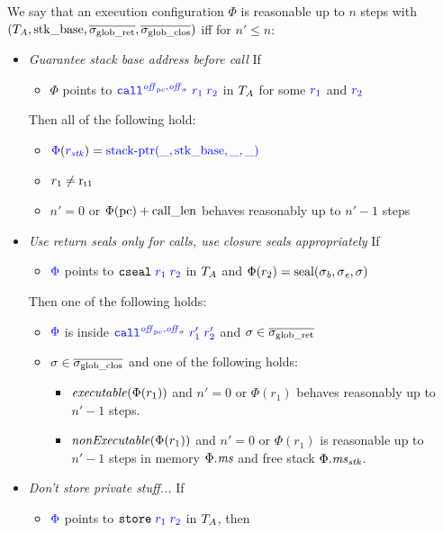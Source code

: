 \documentclass[a4paper]{article}
\begin{document}
\begin{definition}
  \label{def:reasonable-conf}
  We say that an execution configuration $\Phi$ is reasonable up to $n$ steps with $(T_{A},\mathrm{stk\_base},\overline{\sigma_{\mathrm{glob\_ret}}},\overline{\sigma_{\mathrm{glob\_clos}}})$ 
  iff for $n' \leq n$:
  \begin{itemize}
  \item \emph{Guarantee stack base address before call} If
    \begin{itemize}
    \item $\Phi$ points to $\src{\scall{\offpc,\offsigma}{r_1}{r_2}}$ in $T_{A}$
      for some ${\color{blue} r_1}$ and ${\color{blue} r_2}$
    \end{itemize}
    Then all of the following hold:
    \begin{itemize}
    \item ${\color{blue} \Phi}({\color{blue} r_{\mathit{stk}}}) =
      {\color{blue} \mathrm{stack\text{-}ptr}(\_,\mathrm{stk\_base},\_,\_)}$
    \item $r_1 \neq \mathrm{r}_\mathrm{t1}$
    \item $n' = 0$ or $\Phi(\mathrm{pc}) + \mathrm{call\_len}$ behaves reasonably up to $n'-1$ steps
    \end{itemize}
  \item \emph{Use return seals only for calls, use closure seals appropriately} If
    \begin{itemize}
    \item ${\color{blue} \Phi}$ points to $\src{\tcseal{r_1}{r_2}}$ in $T_{A}$ and $\Phi(r_2) = \mathrm{seal}(\sigma_{\mathit{b}},\sigma_{\mathit{e}},\sigma)$
    \end{itemize}
    Then one of the following holds:
    \begin{itemize}
    \item ${\color{blue} \Phi}$ is inside $\src{\scall{\offpc,\offsigma}{r_1'}{r_2'}}$ and $\sigma \in \overline{\sigma_{\mathrm{glob\_ret}}}$
    \item $\sigma \in \overline{\sigma_{\mathrm{glob\_clos}}}$ and one of the following holds:
      \begin{itemize}
      \item $\exec{\Phi(r_1)}$ and $n' = 0$ or $\Phi(r_1)$ behaves reasonably up to $n' - 1$ steps.
      \item $\nonExec{\Phi(r_1)}$ and $n' = 0$ or $\Phi(r_1)$ is reasonable up to $n' - 1$ steps in memory $\Phi.\mathit{ms}$ and free stack $\Phi.\mathit{ms}_{\mathit{stk}}$.
      \end{itemize}
    \end{itemize}
  \item \emph{Don't store private stuff...} If
    \begin{itemize}
    \item ${\color{blue} \Phi}$ points to $\src{\tstore{r_1}{r_2}}$ in $T_{A}$, then

\end{itemize}
\end{itemize}
\end{definition}
\end{document}
